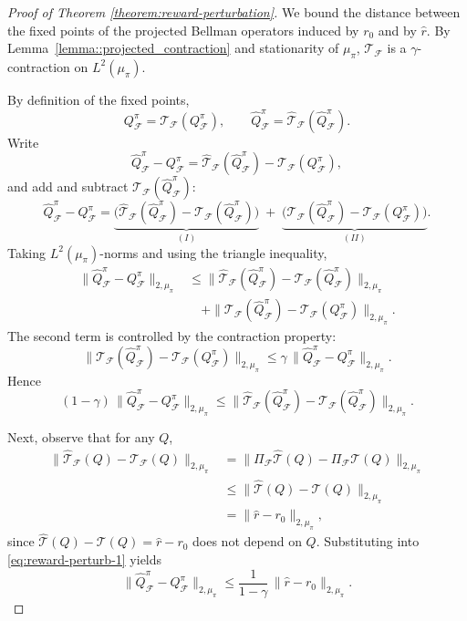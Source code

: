 \documentclass{article}
\theoremstyle{plain}
\theoremstyle{definition}
\theoremstyle{remark}
\begin{document}
\begin{proof}[Proof of Theorem \ref{theorem:reward-perturbation}]
We bound the distance between the fixed points of the projected Bellman
operators induced by \(r_0\) and by \(\widehat r\). By
Lemma~\ref{lemma::projected_contraction} and stationarity of ${\mu_\pi}$,
$\mathcal{T}_{\mathcal F}$ is a $\gamma$-contraction on $L^2({\mu_\pi})$.

By definition of the fixed points,
\[
Q^\pi_{\mathcal F} = \mathcal{T}_{\mathcal F}(Q^\pi_{\mathcal F}),
\qquad
\widehat Q^\pi_{\mathcal F}
= \widehat{\mathcal{T}}_{\mathcal F}(\widehat Q^\pi_{\mathcal F}).
\]
Write
\[
\widehat Q^\pi_{\mathcal F} - Q^\pi_{\mathcal F}
=
\widehat{\mathcal{T}}_{\mathcal F}(\widehat Q^\pi_{\mathcal F})
-
\mathcal{T}_{\mathcal F}(Q^\pi_{\mathcal F}),
\]
and add and subtract
\(\mathcal{T}_{\mathcal F}(\widehat Q^\pi_{\mathcal F})\):
\[
\widehat Q^\pi_{\mathcal F} - Q^\pi_{\mathcal F}
=
\underbrace{\bigl(\widehat{\mathcal{T}}_{\mathcal F}(\widehat Q^\pi_{\mathcal F})
               - \mathcal{T}_{\mathcal F}(\widehat Q^\pi_{\mathcal F})\bigr)}_{(I)}
\;+\;
\underbrace{\bigl(\mathcal{T}_{\mathcal F}(\widehat Q^\pi_{\mathcal F})
               - \mathcal{T}_{\mathcal F}(Q^\pi_{\mathcal F})\bigr)}_{(II)}.
\]
Taking $L^2({\mu_\pi})$-norms and using the triangle inequality,
\begin{align*}
\|\widehat Q^\pi_{\mathcal F} - Q^\pi_{\mathcal F}\|_{2,{\mu_\pi}}
&\le
\|\widehat{\mathcal{T}}_{\mathcal F}(\widehat Q^\pi_{\mathcal F})
  - \mathcal{T}_{\mathcal F}(\widehat Q^\pi_{\mathcal F})\|_{2,{\mu_\pi}}
\\
&\quad+
\|\mathcal{T}_{\mathcal F}(\widehat Q^\pi_{\mathcal F})
  - \mathcal{T}_{\mathcal F}(Q^\pi_{\mathcal F})\|_{2,{\mu_\pi}}.
\end{align*}
The second term is controlled by the contraction property:
\[
\|\mathcal{T}_{\mathcal F}(\widehat Q^\pi_{\mathcal F})
  - \mathcal{T}_{\mathcal F}(Q^\pi_{\mathcal F})\|_{2,{\mu_\pi}}
\le
\gamma\,\|\widehat Q^\pi_{\mathcal F} - Q^\pi_{\mathcal F}\|_{2,{\mu_\pi}}.
\]
Hence
\begin{equation}
\label{eq:reward-perturb-1}
(1-\gamma)\,\|\widehat Q^\pi_{\mathcal F} - Q^\pi_{\mathcal F}\|_{2,{\mu_\pi}}
\le
\|\widehat{\mathcal{T}}_{\mathcal F}(\widehat Q^\pi_{\mathcal F})
  - \mathcal{T}_{\mathcal F}(\widehat Q^\pi_{\mathcal F})\|_{2,{\mu_\pi}}.
\end{equation}

Next, observe that for any $Q$,
\begin{align*}
\|\widehat{\mathcal{T}}_{\mathcal F}(Q) - \mathcal{T}_{\mathcal F}(Q)\|_{2,{\mu_\pi}}
&=
\|\Pi_{\mathcal F}\widehat{\mathcal{T}}(Q)
  - \Pi_{\mathcal F}\mathcal{T}(Q)\|_{2,{\mu_\pi}}
\\
&\le
\|\widehat{\mathcal{T}}(Q) - \mathcal{T}(Q)\|_{2,{\mu_\pi}}
\\
&=
\|\widehat r - r_0\|_{2,{\mu_\pi}},
\end{align*}
since $\widehat{\mathcal{T}}(Q) - \mathcal{T}(Q) = \widehat r - r_0$ does not depend on $Q$.
Substituting into \eqref{eq:reward-perturb-1} yields
\[
\|\widehat Q^\pi_{\mathcal F} - Q^\pi_{\mathcal F}\|_{2,{\mu_\pi}}
\le
\frac{1}{1-\gamma}\,
\|\widehat r - r_0\|_{2,{\mu_\pi}}.
\]
 


\end{proof}
\end{document}
